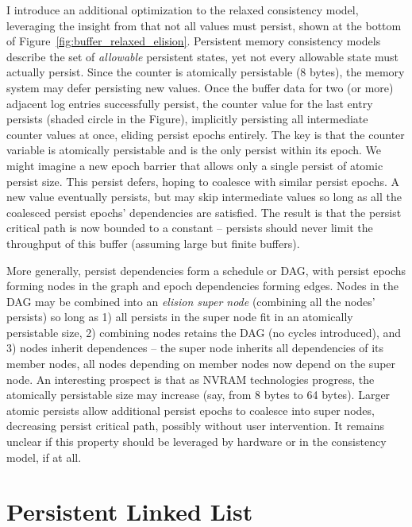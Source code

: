 I introduce an additional optimization to the relaxed consistency model, leveraging the insight from \cite{FangHsiao11} that not all values must persist, shown at the bottom of Figure~\ref{fig:buffer_relaxed_elision}.
Persistent memory consistency models describe the set of \emph{allowable} persistent states, yet not every allowable state must actually persist.
Since the counter is atomically persistable (8 bytes), the memory system may defer persisting new values.
Once the buffer data for two (or more) adjacent log entries successfully persist, the counter value for the last entry persists (shaded circle in the Figure), implicitly persisting all intermediate counter values at once, eliding persist epochs entirely.
The key is that the counter variable is atomically persistable and is the only persist within its epoch.
We might imagine a new epoch barrier that allows only a single persist of atomic persist size.
This persist defers, hoping to coalesce with similar persist epochs.
A new value eventually persists, but may skip intermediate values so long as all the coalesced persist epochs' dependencies are satisfied.
The result is that the persist critical path is now bounded to a constant -- persists should never limit the throughput of this buffer (assuming large but finite buffers).

More generally, persist dependencies form a schedule or DAG, with persist epochs forming nodes in the graph and epoch dependencies forming edges.
Nodes in the DAG may be combined into an \emph{elision super node} (combining all the nodes' persists) so long as 1) all persists in the super node fit in an atomically persistable size, 2) combining nodes retains the DAG (no cycles introduced), and 3) nodes inherit dependences -- the super node inherits all dependencies of its member nodes, all nodes depending on member nodes now depend on the super node.
An interesting prospect is that as NVRAM technologies progress, the atomically persistable size may increase (say, from 8 bytes to 64 bytes).
Larger atomic persists allow additional persist epochs to coalesce into super nodes, decreasing persist critical path, possibly without user intervention.
It remains unclear if this property should be leveraged by hardware or in the consistency model, if at all.

\section{Persistent Linked List}
\label{sec:PMC_patterns:LinkedList}


